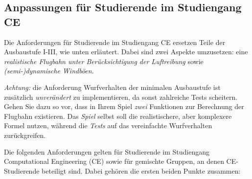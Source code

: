 \subsection{Anpassungen f\"ur Studierende im Studiengang CE}

Die Anforderungen f\"ur Studierende im Studiengang CE ersetzen Teile der Ausbaustufe I-III, wie unten erl\"autert. Dabei sind zwei Aspekte
umzusetzen: eine \emph{realistische Flugbahn unter Ber\"ucksichtigung der Luftreibung} sowie \emph{(semi-)dynamische Windb\"oen}.

\emph{Achtung:} die Anforderung \glqq{}Wurfverhalten\grqq{} der minimalen Ausbaustufe ist zus\"atzlich \emph{unver\"andert} zu
implementieren, da sonst zahlreiche Tests scheitern. Gehen Sie dazu so vor, dass in Ihrem Spiel \emph{zwei} Funktionen zur
Berechnung der Flugbahn existieren. Das \emph{Spiel} selbst soll die realistischere, aber komplexere Formel nutzen, w\"ahrend die
\emph{Tests} auf das vereinfachte \glqq{}Wurfverhalten\grqq{} zur\"uckgreifen.

Die folgenden Anforderungen gelten f\"ur Studierende im Studiengang Computational Engineering (CE) sowie f\"ur gemischte Gruppen, an denen
CE-Studierende beteiligt sind. Dabei geh\"oren die ersten beiden Punkte zusammen:

